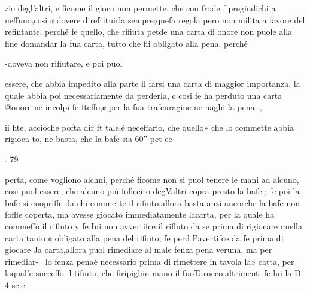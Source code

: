 \documentclass[12pt,a6paper]{article}
\begin{document}
 
 

 

 

 

 

 

 

 

zio degl’altri, e ficome il gioco
non permette, che con frode f
pregiudichi a neffuno,cosi ¢ dovere direftituirla sempre;quefa
regola pero non milita a favore
del refintante, perché fe quello,
che rifiuta petde una carta di
onore non puole alla fine domandar la fua carta, tutto che
fii obligato alla pena, perché

-doveva non rifiutare, e poi puol

essere, che abbia impedito alla
parte il farsi una carta di maggior importanza, la quale abbia poi necessariamente da perderla, ¢ cosi fe ha perduto una
carta @onore ne incolpi fe fteffo,¢ per la fua trafcuragine ne
naghi la pena .,

ii hte, accioche pofta dir ft
tale,é neceffario, che quello»
che lo commette abbia rigioca
to, ne basta, che la bafe sia 60”
pet
ee
   
 
  
   
   
 
 
  
  
  
   
  
  
  
  

. 79

perta, come vogliono alchni,
perché ficome non si puol tenere le mani ad alcuno, cosi puol
essere, che alcuno più follecito
degValtri copra presto la bafe ;
fe poi la bafe si cuopriffe da chi
commette il rifiuto,allora basta
anzi ancorche la bafe non foffle
coperta, ma avesse giocato immediatamente lacarta, per la
quale ha commeffo il rifiuto y
fe Ini non avvertifce il rifluto da
se prima di rigiocare quella carta tanto ¢ obligato alla pena del
rifiuto, fe perd Pavertifce da fe
prima di giocare Ja carta,allora
puol rimediare al male fenza
pena veruna, ma per rimediar-~
lo fenza penaé necessario prima di rimettere in tavola la»
catta, per laqual’e succeffo il
tifiuto, che firipigliin mano il
fuoTarocco,altrimenti fe lui la
D 4 scie
 
 

 

 

 

 

 
\end{document}
